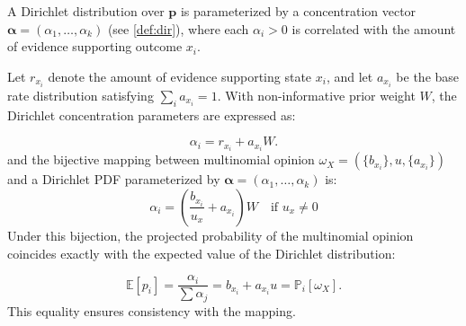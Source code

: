 A Dirichlet distribution over $\boldsymbol{p}$ is parameterized by a concentration vector $\boldsymbol{\alpha} = (\alpha_1, \dots, \alpha_k)$ (see \cref{def:dir}), where each $\alpha_i > 0$ is correlated with the amount of evidence supporting outcome $x_i$. 

Let $r_{x_i}$ denote the amount of evidence supporting state $x_i$, and let $a_{x_i}$ be the base rate distribution satisfying $\sum_i a_{x_i} = 1$. 
With non-informative prior weight $W$, the Dirichlet concentration parameters are expressed as:

\begin{equation}
\alpha_i = r_{x_i} + a_{x_i} W.
\end{equation}
and the bijective mapping between multinomial opinion $\omega_X = (\{b_{x_i}\}, u, \{a_{x_i}\})$ and a Dirichlet \ac{PDF} parameterized by $\boldsymbol{\alpha} = (\alpha_1, \dots, \alpha_k)$ is:
\begin{equation}
\alpha_i = \left(\frac{b_{x_i}}{u_x} + a_{x_i}\right) W \quad \text{if } u_x \neq 0
\label{eq:dirichlet_forward_mapping}
\end{equation}
Under this bijection, the projected probability of the multinomial opinion coincides exactly with the expected value of the Dirichlet distribution:

\begin{equation}
\mathbb{E}[p_i] = \frac{\alpha_i}{\sum \alpha_j} = b_{x_i} + a_{x_i} u = \mathbb{P}_{i}[\omega_X].
\end{equation}
This equality ensures consistency with the mapping.

